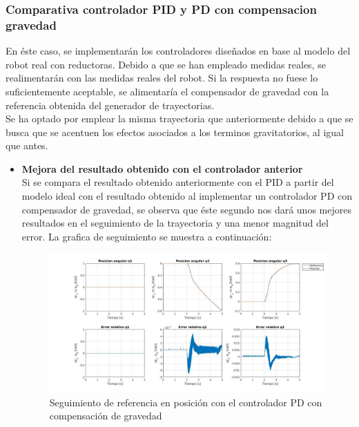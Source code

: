 \newpage
\subsubsection{Comparativa controlador PID y PD con compensacion gravedad}
En éste caso, se implementarán los controladores diseñados en base al modelo del robot real con reductoras. Debido a que se han empleado medidas reales, se realimentarán con las medidas reales del robot. Si la respuesta no fuese lo suficientemente aceptable, se alimentaría el compensador de gravedad con la referencia obtenida del generador de trayectorias. \\
Se ha optado por emplear la misma trayectoria que anteriormente debido a que se busca que se acentuen los efectos asociados a los terminos gravitatorios, al igual que antes.\\
\begin{itemize}
	\item \textbf{Mejora del resultado obtenido con el controlador anterior} \\
Si se compara el resultado obtenido anteriormente con el PID a partir del modelo ideal con el resultado obtenido al implementar un controlador PD con compensador de gravedad, se observa que éste segundo nos dará unos mejores resultados en el seguimiento de la trayectoria y una menor magnitud del error. La grafica de seguimiento se muestra a continuación:

\begin{figure}[h!]
	\centering
	\includegraphics[width=.8\textwidth]{exp2_posPDcomp}
	\caption{Seguimiento de referencia en posición con el controlador PD con compensación de gravedad}
\end{figure}

\end{itemize}

